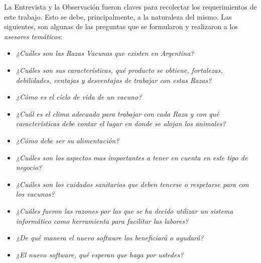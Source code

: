 \documentclass[11pt,oneside]{book}
\begin{document}
La Entrevista y la Observación fueron claves para recolectar los requerimientos de este trabajo. Esto se debe, principalmente, a la naturaleza del mismo. Las siguientes, son algunas de las preguntas que se formularon y realizaron a los \textit{asesores temáticos}:
\begin{itemize}
\item \textit{¿Cuáles son las Razas Vacunas que existen en Argentina?}
\item \textit{¿Cuáles son sus características, qué producto se obtiene, fortalezas, debilidades, ventajas y desventajas de trabajar con estas Razas?}
\item \textit{¿Cómo es el ciclo de vida de un vacuno?}
\item \textit{¿Cuál es el clima adecuado para trabajar con cada Raza y con qué características debe contar el lugar en donde se alojan los animales?}
\item \textit{¿Cómo debe ser su alimentación?}
\item \textit{¿Cuáles son los aspectos mas importantes a tener en cuenta en este tipo de negocio?}
\item \textit{¿Cuáles son los cuidados sanitarios que deben tenerse o respetarse para con los vacunos?}
\item \textit{¿Cuáles fueron las razones por las que se ha decido utilizar un sistema informático como herramienta para facilitar las labores?}
\item \textit{¿De qué manera el nuevo software los beneficiará o ayudará?}  
\item \textit{¿El nuevo software, qué esperan que haga por ustedes?}
\end{itemize}
\end{document}
